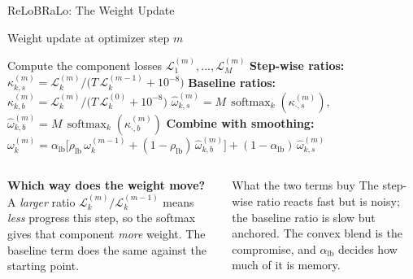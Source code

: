 \documentclass[aspectratio=169,11pt]{beamer}
\begin{document}
\begin{frame}{ReLoBRaLo: The Weight Update}
\begin{block}{Weight update at optimizer step $m$}
\footnotesize
\begin{algorithmic}
\STATE Compute the component losses $\mathcal{L}_1^{(m)}, \ldots, \mathcal{L}_M^{(m)}$
\STATE \textbf{Step-wise ratios:}\; $\kappa_{k,s}^{(m)}=\mathcal{L}_k^{(m)}/\bigl(T\,\mathcal{L}_k^{(m-1)}+10^{-8}\bigr)$
\STATE \textbf{Baseline ratios:}\; $\kappa_{k,b}^{(m)}=\mathcal{L}_k^{(m)}/\bigl(T\,\mathcal{L}_k^{(0)}+10^{-8}\bigr)$
\STATE $\hat \omega_{k,s}^{(m)}=M\,\operatorname{softmax}_k(\kappa_{\cdot,s}^{(m)})$, \quad
       $\hat \omega_{k,b}^{(m)}=M\,\operatorname{softmax}_k(\kappa_{\cdot,b}^{(m)})$
\STATE \textbf{Combine with smoothing:}\;
       $\omega_k^{(m)} = \alpha_{\mathrm{lb}} \bigl[\rho_{\mathrm{lb}} \, \omega_k^{(m-1)} + (1-\rho_{\mathrm{lb}}) \, \hat{\omega}_{k,b}^{(m)}\bigr] + (1-\alpha_{\mathrm{lb}}) \, \hat{\omega}_{k,s}^{(m)}$
\end{algorithmic}
\end{block}

\begin{columns}[T]
\textbf{Which way does the weight move?} A \emph{larger} ratio $\mathcal{L}_k^{(m)}/\mathcal{L}_k^{(m-1)}$ means \emph{less} progress this step, so the softmax gives that component \emph{more} weight. The baseline term does the same against the starting point.

\begin{exampleblock}{What the two terms buy}
\footnotesize
The step-wise ratio reacts fast but is noisy; the baseline ratio is slow but anchored. The convex blend is the compromise, and $\alpha_{\mathrm{lb}}$ decides how much of it is memory.
\end{exampleblock}
\end{columns}
\end{frame}
\end{document}
